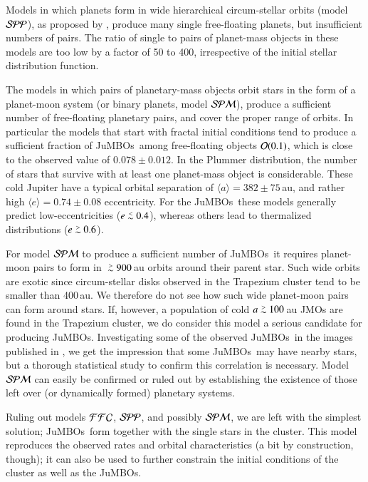 \documentclass[submission,phys]{lib/SciPost}
\def\apgt{\ {\raise-.5ex\hbox{$\buildrel>\over\sim$}}\ }
\def\aplt{\ {\raise-.5ex\hbox{$\buildrel<\over\sim$}}\ }
\newcommand{\jumbos}{\mbox{JuMBOs}}
\begin{document}
Models in which planets form in wide hierarchical circum-stellar
orbits (model ${\cal SPP}$), as proposed by
\cite{2023arXiv231006016W}, produce many single free-floating planets,
but insufficient numbers of pairs. The ratio of single to pairs of
planet-mass objects in these models are too low by a factor of 50 to
400, irrespective of the initial stellar distribution function.

The models in which pairs of planetary-mass objects orbit stars in the
form of a planet-moon system (or binary planets, model ${\cal SPM}$),
produce a sufficient number of free-floating planetary pairs, and cover
the proper range of orbits.  In particular the models that start with
fractal initial conditions tend to produce a sufficient fraction of
\jumbos\, among free-floating objects ${\cal O}(0.1)$, which is close
to the observed value of $0.078\pm0.012$. In the Plummer distribution,
the number of stars that survive with at least one planet-mass object
is considerable.  These cold Jupiter have a typical orbital separation
of $\langle a\rangle = 382\pm75$\,au, and rather high $\langle e \rangle
= 0.74\pm 0.08$ eccentricity.  For the \jumbos\, these models
generally predict low-eccentricities ($e\aplt 0.4$), whereas others
lead to thermalized distributions ($e\apgt 0.6$).

For model ${\cal SPM}$ to produce a sufficient number of \jumbos\, it
requires planet-moon pairs to form in $\apgt 900$\,au orbits around
their parent star. Such wide orbits are exotic since circum-stellar disks 
observed in the Trapezium cluster tend to be smaller than 400\,au. 
We therefore do not see how such wide planet-moon pairs can form around 
stars. If, however, a population of cold $a\apgt 100$\,au JMOs are 
found in the Trapezium cluster, we do consider this model a 
serious candidate for producing \jumbos. Investigating some of the observed 
\jumbos\ in the images published in \cite{2023arXiv231001231P}, we get the 
impression that some \jumbos\, may have nearby stars, but a thorough statistical 
study to confirm this correlation is necessary.  Model ${\cal SPM}$ can easily be
confirmed or ruled out by establishing the existence of those left
over (or dynamically formed) planetary systems.

Ruling out models ${\cal FFC}$, ${\cal SPP}$, and possibly ${\cal
  SPM}$, we are left with the simplest solution; \jumbos\, form
together with the single stars in the cluster.  This model reproduces
the observed rates and orbital characteristics (a bit by construction,
though); it can also be used to further constrain the initial
conditions of the cluster as well as the \jumbos.
\end{document}
